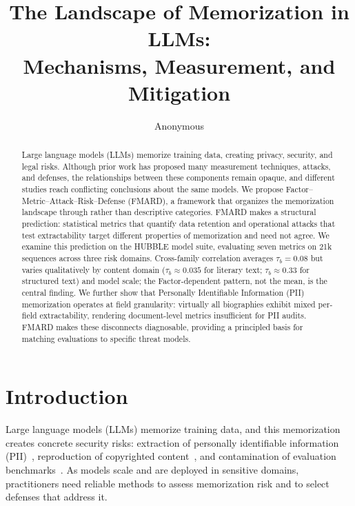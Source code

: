 \documentclass[11pt]{article}
\title{The Landscape of Memorization in LLMs:\\
       Mechanisms, Measurement, and Mitigation}
\author{Anonymous}
\begin{document}
\maketitle

\begin{abstract}
Large language models (LLMs) memorize training data, creating privacy,
security, and legal risks.
Although prior work has proposed many measurement techniques, attacks, and
defenses, the relationships between these components remain opaque, and
different studies reach conflicting conclusions about the same models.
We propose Factor--Metric--Attack--Risk--Defense (FMARD), a framework that
organizes the memorization landscape through
rather than descriptive categories.
FMARD makes a structural prediction: statistical metrics that quantify data
retention and operational attacks that test extractability target different
properties of memorization and need not agree.
We examine this prediction on the HUBBLE model suite, evaluating seven metrics
on 21k sequences across three risk domains.
Cross-family correlation averages $\tau_b = 0.08$ but varies qualitatively by
content domain ($\tau_b \approx 0.035$ for literary text; $\tau_b \approx 0.33$
for structured text) and model scale; the Factor-dependent pattern, not the
mean, is the central finding.
We further show that Personally Identifiable Information (PII) memorization operates at field granularity: virtually
all biographies exhibit mixed per-field extractability, rendering document-level
metrics insufficient for PII audits.
FMARD makes these disconnects diagnosable, providing a principled basis for
matching evaluations to specific threat models.
\end{abstract}


\section{Introduction}
\label{sec:intro}

Large language models (LLMs) memorize training data, and this memorization
creates concrete security risks: extraction of personally identifiable
information (PII)~\citep{carlini2021extractingtrainingdatalarge, lukas2023analyzing},
reproduction of copyrighted
content~\citep{carlini2023quantifyingmemorizationneurallanguage,
henderson2023foundation}, and contamination of evaluation
benchmarks~\citep{magar2022data}.
As models scale and are deployed in sensitive domains, practitioners need
reliable methods to assess memorization risk and to select defenses that
address it.
\end{document}
